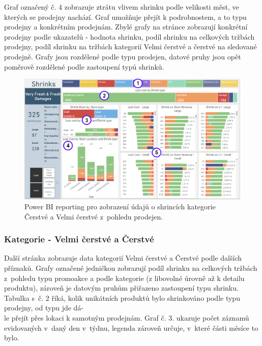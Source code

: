 Graf označený č. 4 zobrazuje ztrátu vlivem shrinku podle velikosti měst, ve kterých se prodejny nachází. Graf umožňuje přejít k podrobnostem, a to typu prodejny a konkrétním prodejnám. Zbylé grafy na stránce zobrazují konkrétní prodejny podle ukazatelů - hodnota shrinku, podíl shrinku na celkových tržbách prodejny, podíl shrinku na tržbách kategorií Velmi čerstvé a čerstvé na sledované prodejně. Grafy jsou rozdělené podle typu prodejen, datové pruhy jsou opět poměrově rozdělené podle zastoupení typů shrinků.

\begin{figure}[h!]
    \centering
    \captionsetup{justification=centering}
    \includegraphics[width=\textwidth]{obrazky/PBI/storesSFF.png}
    \caption{Power BI reporting pro zobrazení údajů o shrincích kategorie \\ Čerstvé a Velmi čerstvé z~pohledu prodejen.}
    \label{obr:PBI:storesSFF}
\end{figure}

\subsubsection*{Kategorie - Velmi čerstvé a Čerstvé}

Další stránka zobrazuje data kategorií Velmi čerstvé a Čerstvé podle dalších příznaků. Grafy označené jedničkou zobrazují podíl shrinku na celkových tržbách z~pohledu typu promoakce a podle kategorie (z libovolné úrovně až k detailu produktu), zároveň je datovým pruhům přiřazeno zastoupení typu shrinku. Tabulka s~č. 2 říká, kolik unikátních produktů bylo shrinkováno podle typu prodejny, od typu jde dá-\\le přejít přes lokaci k samotným prodejnám. Graf č. 3. ukazuje počet záznamů evidovaných v~daný den v~týdnu, legenda zároveň určuje, v~které části měsíce to bylo. 

